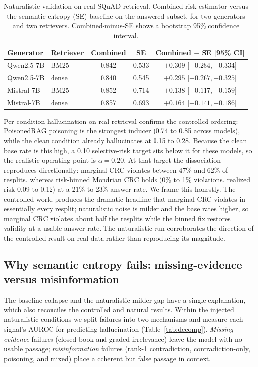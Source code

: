 \documentclass[sn-basic]{sn-jnl}
\theoremstyle{thmstyleone}
\theoremstyle{thmstyletwo}
\begin{document}
\begin{table}[tbp]
\centering\small
\caption{Naturalistic validation on real SQuAD retrieval. Combined risk
estimator versus the semantic entropy (SE) baseline on the answered
subset, for two generators and two retrievers. Combined-minus-SE shows a
bootstrap 95\% confidence interval.}
\label{tab:natauroc}
\begin{tabular}{llccc}
\toprule
Generator & Retriever & Combined & SE & Combined $-$ SE [95\% CI] \\
\midrule
Qwen2.5-7B & BM25  & 0.842 & 0.533 & $+0.309$ [$+0.284, +0.334$] \\
Qwen2.5-7B & dense & 0.840 & 0.545 & $+0.295$ [$+0.267, +0.325$] \\
Mistral-7B & BM25  & 0.852 & 0.714 & $+0.138$ [$+0.117, +0.159$] \\
Mistral-7B & dense & 0.857 & 0.693 & $+0.164$ [$+0.141, +0.186$] \\
\bottomrule
\end{tabular}
\end{table}

Per-condition hallucination on real retrieval confirms the controlled ordering: PoisonedRAG poisoning is the strongest
inducer (0.74 to 0.85 across models), while the clean condition already
hallucinates at 0.15 to 0.28. Because the clean base rate is this high, a
0.10 selective-risk target sits below it for these models, so the
realistic operating point is $\alpha = 0.20$. At that target the
dissociation reproduces directionally: marginal CRC violates between 47\%
and 62\% of resplits, whereas risk-binned Mondrian CRC holds (0\% to 1\%
violations, realized risk 0.09 to 0.12) at a 21\% to 23\% answer rate. We
frame this honestly. The controlled world produces the dramatic
headline that marginal CRC violates in essentially every resplit;
naturalistic noise is milder and the base rates higher, so marginal CRC
violates about half the resplits while the binned fix restores validity
at a usable answer rate. The naturalistic run corroborates the direction
of the controlled result on real data rather than reproducing its
magnitude.



\subsection{Why semantic entropy fails: missing-evidence versus
misinformation}\label{sec:decomp}
The baseline collapse and the naturalistic milder gap have a single
explanation, which also reconciles the controlled and natural results.
Within the injected naturalistic conditions we split failures into two
mechanisms and measure each signal's AUROC for predicting hallucination
(Table~\ref{tab:decomp}). \emph{Missing-evidence} failures (closed-book
and graded irrelevance) leave the model with no usable passage;
\emph{misinformation} failures (rank-1 contradiction, contradiction-only,
poisoning, and mixed) place a coherent but false passage in context.
\end{document}
